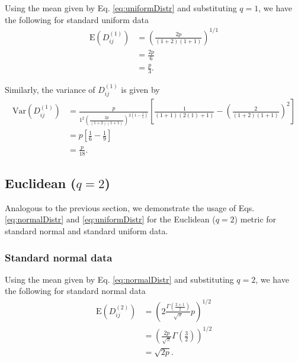 \documentclass[10pt,letterpaper]{article}\usepackage[]{graphicx}\usepackage[]{color}
\begin{document}
Using the mean given by Eq. \ref{eq:uniformDistr} and substituting $q=1$, we have the following for standard uniform data
%
\begin{equation}\label{eq:uniformManMean}
\begin{aligned}
\text{E}\left(D^{(1)}_{ij}\right) &= \left(\frac{2p}{(1+2)(1+1)}\right)^{1/1} \\
&= \frac{2p}{6} \\
&= \frac{p}{3}.
\end{aligned}
\end{equation}

Similarly, the variance of $D^{(1)}_{ij}$ is given by
%
\begin{equation}\label{eq:uniformManVar}
\begin{aligned}
\text{Var}\left(D^{(1)}_{ij}\right) &= \frac{p}{1^2\left(\frac{2p}{(1 + 2)(1 + 1)}\right)^{2\left(1 - \frac{1}{1}\right)}}\left[\frac{1}{(1 + 1)(2(1) + 1)} - \left(\frac{2}{(1 + 2)(1 + 1)}\right)^2\right] \\
&= p\left[\frac{1}{6} - \frac{1}{9}\right] \\
&= \frac{p}{18}.
\end{aligned}
\end{equation}

\subsection{Euclidean \texorpdfstring{($q=2$)}{}}

Analogous to the previous section, we demonstrate the usage of Eqs. \ref{eq:normalDistr} and \ref{eq:uniformDistr} for the Euclidean ($q=2$) metric for standard normal and standard uniform data.

\subsubsection{Standard normal data}

Using the mean given by Eq. \ref{eq:normalDistr} and substituting $q=2$, we have the following for standard normal data
%
\begin{equation}\label{eq:normalEucMean}
\begin{aligned}
\text{E}\left(D^{(2)}_{ij}\right) &= \left(2\frac{\Gamma\left(\frac{2 + 1}{2}\right)}{\sqrt{\pi}}p\right)^{1/2} \\
&= \left(\frac{2p}{\sqrt{\pi}}\Gamma\left(\frac{3}{2}\right)\right)^{1/2} \\
&= \sqrt{2p}.
\end{aligned}
\end{equation}
\end{document}
